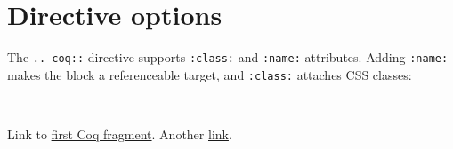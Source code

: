 \documentclass[a4paper]{article}
\begin{document}
\section{Directive options%
  \label{directive-options}%
}

The \texttt{.. coq::} directive supports \texttt{:class:} and \texttt{:name:} attributes.  Adding \texttt{:name:} makes the block a referenceable target, and \texttt{:class:} attaches CSS classes:

\begin{alectryon}
  \begin{\al{sentence}}
    \begin{\al{input}}
      ~~~
    \end{\al{input}}
  \end{\al{sentence}}
\end{alectryon}

Link to \hyperref[test]{first Coq fragment}.
Another \hyperref[test]{link}.
\end{document}
